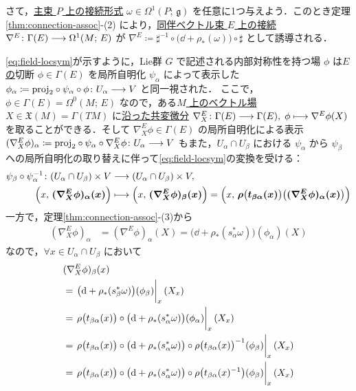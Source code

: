 \documentclass[geometry_main]{subfiles}
\begin{document}
さて，\underline{主束 $P$ 上の}\hyperref[def:connection]{接続形式} $\omega \in \Omega^1(P;\, \mathfrak{g})$ を任意に1つ与えよう．このとき定理\ref{thm:connection-assoc}-(2) により，\underline{同伴ベクトル束 $E$ 上の}\hyperref[def:connection-vect]{接続} $\nabla^E \colon \Gamma(E) \longrightarrow \Omega^1(M;\, E)$ が $\nabla^E \coloneqq \sharp^{-1}\circ \bigl(\dd + \rho_* (\omega)\bigr) \circ \sharp$ として誘導される．

\eqref{eq:field-locsym}が示すように，Lie群 $G$ で記述される内部対称性を持つ場 $\phi$ は\underline{$E$ の}切断 $\phi \in \Gamma(E)$ を局所自明化 $\psi_\alpha$ によって表示した $\phi_\alpha \coloneqq \mathrm{proj}_2 \circ \psi_\alpha \circ \phi \colon U_\alpha \longrightarrow V$ と同一視された．
ここで，$\phi \in \Gamma(E) = \Omega^0 (M;\, E)$ なので，ある\underline{$M$ 上の}\hyperref[def:vecf]{ベクトル場} $X \in \mathfrak{X}(M) = \Gamma(TM)$ に\hyperref[def:connection-vect]{沿った共変微分} $\nabla_X^E \colon \Gamma(E) \longrightarrow \Gamma(E),\; \phi \longmapsto \nabla^E\phi(X)$ を取ることができる．そして $\nabla^E_X \phi \in \Gamma (E)$ の局所自明化による表示 $(\nabla^E_X \phi)_\alpha \coloneqq \mathrm{proj}_2 \circ \psi_\alpha \circ \nabla^E_X \phi \colon U_\alpha \longrightarrow V$ もまた，$U_\alpha \cap U_\beta$ における $\psi_\alpha$ から $\psi_\beta$ への局所自明化の取り替えに伴って\eqref{eq:field-locsym}の変換を受ける：
\begin{align}
    \psi_\beta \circ \psi_\alpha^{-1} \colon (U_\alpha \cap U_\beta) \times V &\longrightarrow (U_\alpha \cap U_\beta) \times V, \\
    \Bigl( x,\, \bm{(\nabla_X^E\phi)_\alpha (x)} \Bigr) &\longmapsto \Bigl( x,\, \bm{(\nabla_X^E\phi)_\beta (x)}  \Bigr) = \Bigl( x,\, \bm{\rho\bigl(t_{\beta\alpha}(x)\bigr) \bigl( (\nabla_X^E\phi)_\alpha (x)\bigr)}  \Bigr) 
\end{align}
一方で，定理\ref{thm:connection-assoc}-(3)から
\begin{align}
    (\nabla_X^E\phi)_\alpha
    &= (\nabla^E\phi)_\alpha(X)
    = \bigl( \dd + \rho_* (s^*_\alpha \omega) \bigr)( \phi_\alpha ) (X)
\end{align}
なので，$\forall x \in U_\alpha \cap U_\beta$ において
\begin{align}
    &(\nabla_X^E\phi)_\beta (x) \\
    &= \eval{\bigl( \dd + \rho_* (s^*_\beta \omega) \bigr) ( \phi_\beta )}_x (X_x) \\
    &= \eval{\rho \bigl( t_{\beta\alpha}(x) \bigr) \circ \bigl( \dd + \rho_* (s^*_\alpha \omega) \bigr) ( \phi_\alpha )}_x (X_x) \\
    &= \eval{\rho \bigl( t_{\beta\alpha}(x) \bigr) \circ \bigl( \dd + \rho_* (s^*_\alpha \omega) \bigr) \circ \rho\bigl(t_{\beta\alpha}(x)\bigr)^{-1} (\phi_\beta)}_x (X_x) \\
    &= \eval{\rho \bigl( t_{\beta\alpha}(x) \bigr) \circ \bigl( \dd + \rho_* (s^*_\alpha \omega) \bigr) \circ \rho\bigl(t_{\beta\alpha}(x)^{-1}\bigr) (\phi_\beta)}_x (X_x)
\end{align}
\end{document}
